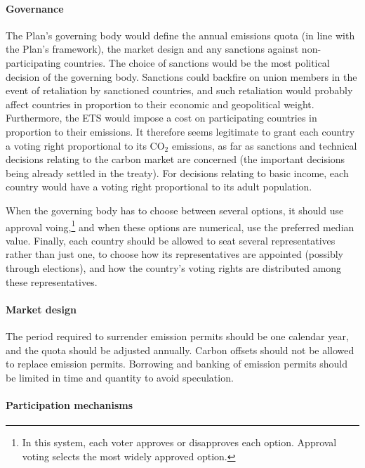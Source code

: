 \documentclass[a5paper,english,openany]{memoir}
\begin{document}
\paragraph{Governance} 
The Plan's governing body would define the annual emissions quota (in line with the Plan's framework), the market design and any sanctions against non-participating countries. %
The choice of sanctions would be the most political decision of the governing body. Sanctions could backfire on union members in the event of retaliation by sanctioned countries, and such retaliation would probably affect countries in proportion to their economic and geopolitical weight. 
Furthermore, the ETS would impose a cost on participating countries in proportion to their emissions. It therefore seems legitimate to grant each country a voting right proportional to its CO$_\text{2}$ emissions, as far as sanctions and technical decisions relating to the carbon market are concerned (the important decisions being already settled in the treaty). 
For decisions relating to basic income, each country would have a voting right proportional to its adult population. 

When the governing body has to choose between several options, it should use approval voing,\footnote{In this system, each voter approves or disapproves each option. Approval voting selects the most widely approved option.} and when these options are numerical, use the preferred median value. Finally, each country should be allowed to seat several representatives rather than just one, to choose how its representatives are appointed (possibly through elections), and how the country's voting rights are distributed among these representatives. 


\paragraph{Market design} 
The period required to surrender emission permits should be one calendar year, and the quota should be adjusted annually. Carbon offsets should not be allowed to replace emission permits. Borrowing and banking of emission permits should be limited in time and quantity to avoid speculation. %

\paragraph{Participation mechanisms}
\end{document}
